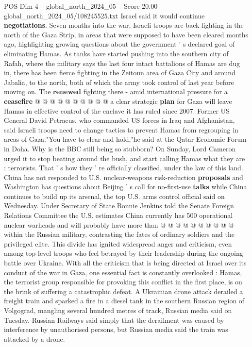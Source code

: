 \begin{textsample}{POS Dim 4 – global\_north\_2024\_05 – Score 20.00 – global\_north\_2024\_05/108245525.txt}
Israel said it would continue \textbf{negotiations}.
Seven months into the war, Israeli troops are back fighting in the north of the Gaza Strip, in areas that were supposed to have been cleared months ago, highlighting growing questions about the government ' s declared goal of eliminating Hamas.
As tanks have started pushing into the southern city of Rafah, where the military says the last four intact battalions of Hamas are dug in, there has been fierce fighting in the Zeitoun area of Gaza City and around Jabalia, to the north, both of which the army took control of last year before moving on.
The \textbf{renewed} fighting there - amid international pressure for a \textbf{ceasefire} @ @ @ @ @ @ @ @ @ @ a clear strategic \textbf{plan} for Gaza will leave Hamas in effective control of the enclave it has ruled since 2007.
Former US General David Petraeus, who commanded US forces in Iraq and Afghanistan, said Israeli troops need to change tactics to prevent Hamas from regrouping in areas of Gaza."You have to clear and hold,"he said at the Qatar Economic Forum in Doha.
Why is the BBC still being so stubborn?
On Sunday, Lord Cameron urged it to stop beating around the bush, and start calling Hamas what they are : terrorists.
That ' s how they ' re officially classified, under the law of this land.
China has not responded to U.S. nuclear-weapons risk-reduction \textbf{proposals} and Washington has questions about Beijing ' s call for no-first-use \textbf{talks} while China continues to build up its arsenal, the top U.S. arms control official said on Wednesday.
Under Secretary of State Bonnie Jenkins told the Senate Foreign Relations Committee the U.S. estimates China currently has 500 operational nuclear warheads and will probably have more than @ @ @ @ @ @ @ @ @ @ within the Russian military, contrasting the fates of ordinary soldiers and the privileged elite.
This divide has ignited widespread anger and criticism, even among top-level troops who feel betrayed by their leadership during the ongoing battle over Ukraine.
With all the criticism that is being directed at Israel over its conduct of the war in Gaza, one essential fact is constantly overlooked : Hamas, the terrorist group responsible for provoking this conflict in the first place, is on the brink of suffering a catastrophic defeat.
A Ukrainian drone attack derailed a freight train and sparked a fire in a diesel tank in the southern Russian region of Volgograd, mangling several hundred metres of track, Russian media said on Tuesday.
Russian Railways said simply that the derailment was caused by interference by unauthorised persons, but Russian media said the train was attacked by a drone.

\end{textsample}
